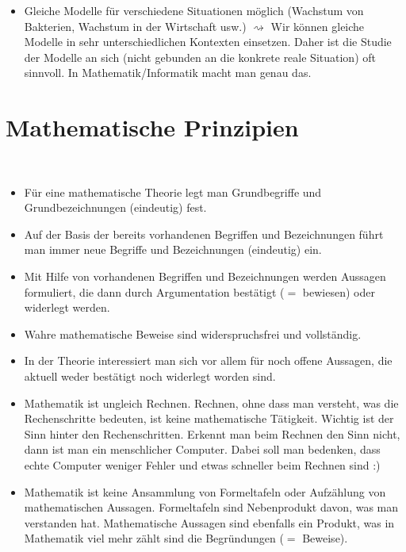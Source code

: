 \begin{bem}
\begin{itemize}
\begin{itemize}
			\item Gleiche Modelle für verschiedene Situationen möglich (Wachstum von Bakterien, Wachstum in der Wirtschaft usw.) $\rightsquigarrow$ Wir können gleiche Modelle in sehr unterschiedlichen Kontexten einsetzen. Daher ist die Studie der Modelle an sich (nicht gebunden an die konkrete reale Situation) oft sinnvoll. In Mathematik/Informatik macht man genau das. 
		\end{itemize} 
	\end{itemize} 
\end{bem}


\section{Mathematische Prinzipien} 

\begin{bem}\ 
	\begin{itemize}
		\item Für eine mathematische Theorie legt man Grundbegriffe und Grundbezeichnungen (eindeutig) fest. 
		\item Auf der Basis der bereits vorhandenen Begriffen und Bezeichnungen führt man immer neue Begriffe und Bezeichnungen (eindeutig) ein. 
		\item Mit Hilfe von vorhandenen Begriffen und Bezeichnungen werden Aussagen formuliert, die dann durch Argumentation bestätigt ($=$ bewiesen) oder widerlegt werden. 
		\item Wahre mathematische Beweise sind widerspruchsfrei und vollständig. 
		\item In der Theorie interessiert man sich vor allem für noch offene Aussagen, die aktuell weder bestätigt noch widerlegt worden sind. 
		\item Mathematik ist ungleich Rechnen. Rechnen, ohne dass man versteht, was die Rechenschritte bedeuten, ist keine mathematische Tätigkeit. Wichtig ist der Sinn hinter den Rechenschritten. Erkennt man beim Rechnen den Sinn nicht, dann ist man ein menschlicher Computer. Dabei soll man bedenken, dass echte Computer  weniger Fehler und  etwas schneller beim Rechnen sind :) 
		\item Mathematik ist keine Ansammlung von Formeltafeln oder Aufzählung von mathematischen Aussagen. Formeltafeln sind Nebenprodukt davon, was man verstanden hat. Mathematische Aussagen sind ebenfalls ein Produkt, was in Mathematik viel mehr zählt sind die Begründungen ($=$ Beweise). 
	\end{itemize} 
\end{bem} 
